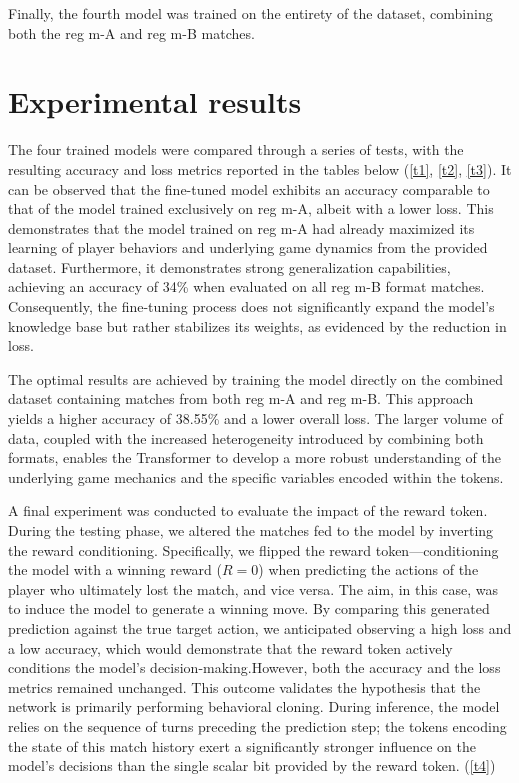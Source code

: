 \documentclass{article}
\begin{document}
Finally, the fourth model was trained on the entirety of the dataset, combining both the reg m-A and reg m-B matches.


\section{Experimental results}
\label{sec:experiments}
The four trained models were compared through a series of tests, with the resulting accuracy and loss metrics reported in the tables below (\ref{t1}, \ref{t2}, \ref{t3}). It can be observed that the fine-tuned model exhibits an accuracy comparable to that of the model trained exclusively on reg m-A, albeit with a lower loss. This demonstrates that the model trained on reg m-A had already maximized its learning of player behaviors and underlying game dynamics from the provided dataset. Furthermore, it demonstrates strong generalization capabilities, achieving an accuracy of 34\% when evaluated on all reg m-B format matches. Consequently, the fine-tuning process does not significantly expand the model's knowledge base but rather stabilizes its weights, as evidenced by the reduction in loss. 

The optimal results are achieved by training the model directly on the combined dataset containing matches from both reg m-A and reg m-B. This approach yields a higher accuracy of 38.55\% and a lower overall loss. The larger volume of data, coupled with the increased heterogeneity introduced by combining both formats, enables the Transformer to develop a more robust understanding of the underlying game mechanics and the specific variables encoded within the tokens.

A final experiment was conducted to evaluate the impact of the reward token. During the testing phase, we altered the matches fed to the model by inverting the reward conditioning. Specifically, we flipped the reward token—conditioning the model with a winning reward ($R=0$) when predicting the actions of the player who ultimately lost the match, and vice versa. The aim, in this case, was to induce the model to generate a winning move. By comparing this generated prediction against the true target action, we anticipated observing a high loss and a low accuracy, which would demonstrate that the reward token actively conditions the model's decision-making.However, both the accuracy and the loss metrics remained unchanged. This outcome validates the hypothesis that the network is primarily performing behavioral cloning. During inference, the model relies on the sequence of turns preceding the prediction step; the tokens encoding the state of this match history exert a significantly stronger influence on the model's decisions than the single scalar bit provided by the reward token. (\ref{t4})
\end{document}
